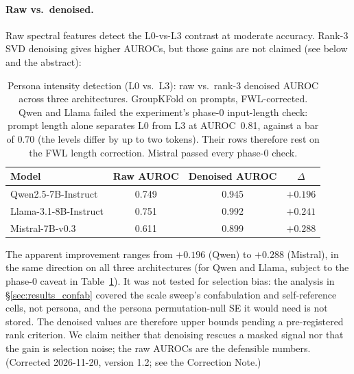 \documentclass[11pt,a4paper]{article}
\begin{document}
\paragraph{Raw vs.\ denoised.} Raw spectral features detect the L0-vs-L3
contrast at moderate accuracy. Rank-3 SVD denoising gives higher AUROCs,
but those gains are not claimed (see below and the abstract):

\begin{table}[h]
\centering
\caption{Persona intensity detection (L0 vs.\ L3): raw vs.\ rank-3 denoised
  AUROC across three architectures. GroupKFold on prompts, FWL-corrected.
  Qwen and Llama failed the experiment's phase-0 input-length check: prompt
  length alone separates L0 from L3 at AUROC~0.81, against a bar of 0.70 (the
  levels differ by up to two tokens). Their rows therefore rest on the FWL
  length correction. Mistral passed every phase-0 check.}
\label{tab:persona_raw_denoised}
\begin{tabular}{lccc}
\toprule
\textbf{Model} & \textbf{Raw AUROC} & \textbf{Denoised AUROC} & \textbf{$\Delta$} \\
\midrule
Qwen2.5-7B-Instruct & 0.749 & 0.945 & $+0.196$ \\
Llama-3.1-8B-Instruct & 0.751 & 0.992 & $+0.241$ \\
Mistral-7B-v0.3 & 0.611 & 0.899 & $+0.288$ \\
\bottomrule
\end{tabular}
\end{table}

The apparent improvement ranges from $+0.196$ (Qwen) to $+0.288$ (Mistral),
in the same direction on all three architectures (for Qwen and Llama, subject
to the phase-0 caveat in Table~\ref{tab:persona_raw_denoised}). It was
not tested for selection bias: the analysis in \S\ref{sec:results_confab}
covered the scale sweep's confabulation and self-reference cells, not
persona, and the persona permutation-null SE it would need is not stored.
The denoised values are therefore upper bounds pending a pre-registered rank
criterion. We claim neither that denoising rescues a masked signal nor that
the gain is selection noise; the raw AUROCs are the defensible numbers.
(Corrected 2026-11-20, version 1.2; see the Correction Note.)
\end{document}
